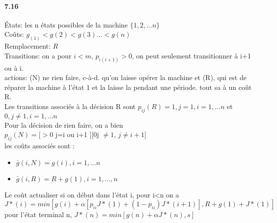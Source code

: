 \documentclass[oneside]{book}
\begin{document}
\paragraph{7.16}

États: les n états possibles de la machine $\{1,2,...n\}$\\
Coûts: $g_(1) < g(2) < g(3)... < g(n)$\\
Remplacement: $R$\\
Transitions: on a pour $i < m$, $p_{i(i+1)}>0$, on peut seulement transitionner à i+1 ou à i.\\
actions: (N) ne rien faire, c-à-d. qu'on laisse opérer la machine et (R), qui est de réparer la machine à l'état 1 et la laisse la pendant une période. tout sa à un coût R.\\

Les transitions associés à la décision R  sont $p_{ij}(R) = 1 ,j=1,i=1,...n$ et $0, j\neq 1, i=1,...n$\\
Pour la décision de rien faire, on a bien \\

$p_{ij}(N) = [>0$ j=i ou i+1 $][0 $j $\neq 1$, $j\neq i+1]$\\

les coûts associés sont :\\
\begin{itemize}
\item $\bar{g}(i,N) = g(i), i=1,...n$
\item $\bar{g}(i,R) = R + g(1), i=1,...,n$
\end{itemize}

Le coût actualiser si on début dans l'état i, pour i<n on a $J*(i) = min[g(i) + \alpha[p_{ii}J*(1) + (1-p_{ii})J*(i+1)], R + g(1) + J*(1)]$\\

pour l'état terminal n, $J*(n) = min[g(n) + \alpha J*(n), s]$

 
\end{document}
